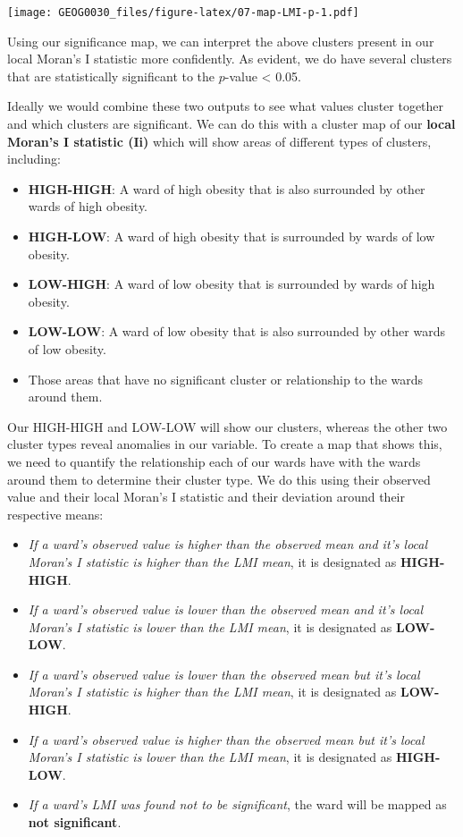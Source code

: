 \documentclass[
]{book}
\providecommand{\tightlist}{%
  \setlength{\itemsep}{0pt}\setlength{\parskip}{0pt}}
\begin{document}
\texttt{[image: GEOG0030\_files/figure-latex/07-map-LMI-p-1.pdf]}

Using our significance map, we can interpret the above clusters present in our local Moran's I statistic more confidently. As evident, we do have several clusters that are statistically significant to the \(p\)-value \textless{} 0.05.

Ideally we would combine these two outputs to see what values cluster together and which clusters are significant. We can do this with a cluster map of our \textbf{local Moran's I statistic (Ii)} which will show areas of different types of clusters, including:

\begin{itemize}
\tightlist
\item
  \textbf{HIGH-HIGH}: A ward of high obesity that is also surrounded by other wards of high obesity.
\item
  \textbf{HIGH-LOW}: A ward of high obesity that is surrounded by wards of low obesity.
\item
  \textbf{LOW-HIGH}: A ward of low obesity that is surrounded by wards of high obesity.
\item
  \textbf{LOW-LOW}: A ward of low obesity that is also surrounded by other wards of low obesity.
\item
  Those areas that have no significant cluster or relationship to the wards around them.
\end{itemize}

Our HIGH-HIGH and LOW-LOW will show our clusters, whereas the other two cluster types reveal anomalies in our variable. To create a map that shows this, we need to quantify the relationship each of our wards have with the wards around them to determine their cluster type. We do this using their observed value and their local Moran's I statistic and their deviation around their respective means:

\begin{itemize}
\tightlist
\item
  \emph{If a ward's observed value is higher than the observed mean and it's local Moran's I statistic is higher than the LMI mean}, it is designated as \textbf{HIGH-HIGH}.
\item
  \emph{If a ward's observed value is lower than the observed mean and it's local Moran's I statistic is lower than the LMI mean}, it is designated as \textbf{LOW-LOW}.
\item
  \emph{If a ward's observed value is lower than the observed mean but it's local Moran's I statistic is higher than the LMI mean}, it is designated as \textbf{LOW-HIGH}.
\item
  \emph{If a ward's observed value is higher than the observed mean but it's local Moran's I statistic is lower than the LMI mean}, it is designated as \textbf{HIGH-LOW}.
\item
  \emph{If a ward's LMI was found not to be significant}, the ward will be mapped as \textbf{not significant}.
\end{itemize}
\end{document}
